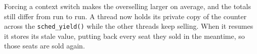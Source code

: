
Forcing a context switch makes the overselling larger on average, and the
totals still differ from run to run. A thread now holds its private copy of the
counter across the \texttt{sched\_yield()} while the other threads keep
selling. When it resumes it stores its stale value, putting back every seat
they sold in the meantime, so those seats are sold again.
